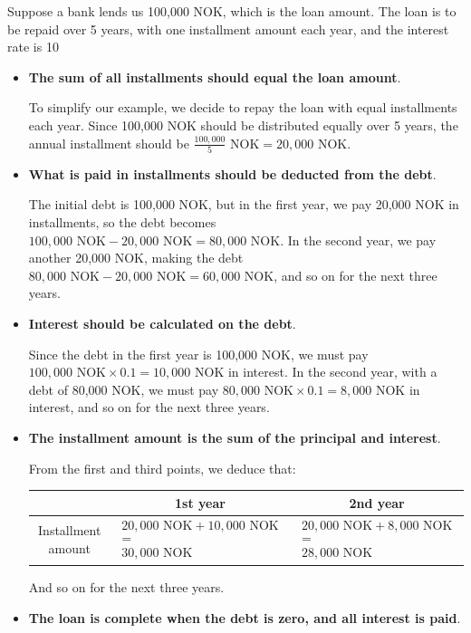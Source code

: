 Suppose a bank lends us 100,000 NOK, which is the loan amount. The loan is to be repaid over 5 years, with one installment amount each year, and the interest rate is 10%
\begin{itemize}
	\item \textbf{The sum of all installments should equal the loan amount}.\vspace{5pt}
	
	To simplify our example, we decide to repay the loan with equal installments each year. Since 100,000 NOK should be distributed equally over 5 years, the annual installment should be $ \frac{100,000}{5} \text{ NOK} = 20,000 \text{ NOK} $.
	\item \textbf{What is paid in installments should be deducted from the debt}.\vspace{5pt}
	
	The initial debt is 100,000 NOK, but in the first year, we pay 20,000 NOK in installments, so the debt becomes $ 100,000 \text{ NOK} - 20,000 \text{ NOK} = 80,000 \text{ NOK} $. In the second year, we pay another 20,000 NOK, making the debt $ 80,000 \text{ NOK} - 20,000 \text{ NOK} = 60,000 \text{ NOK} $, and so on for the next three years.
	\item \textbf{Interest should be calculated on the debt}.\vspace{5pt}
	
	Since the debt in the first year is 100,000 NOK, we must pay $ 100,000 \text{ NOK} \times 0.1 = 10,000 \text{ NOK} $ in interest. In the second year, with a debt of 80,000 NOK, we must pay $ 80,000 \text{ NOK} \times 0.1 = 8,000 \text{ NOK} $ in interest, and so on for the next three years.
	\item \textbf{The installment amount is the sum of the principal and interest}.\vspace{5pt}
	
	From the first and third points, we deduce that:
	\begin{center}
		\begin{tabular}{c|c|c}
			& 1st year & 2nd year \\ \hline
			Installment amount & $\begin{matrix} 20,000 \text{ NOK} + 10,000 \text{ NOK} \\ = \\ 30,000 \text{ NOK} \end{matrix} $ & $\begin{matrix} 20,000 \text{ NOK} + 8,000 \text{ NOK} \\ = \\ 28,000 \text{ NOK} \end{matrix} $
		\end{tabular}
	\end{center}
	And so on for the next three years.
	\item \textbf{The loan is complete when the debt is zero, and all interest is paid}.\vspace{5pt}
	

\end{itemize}
